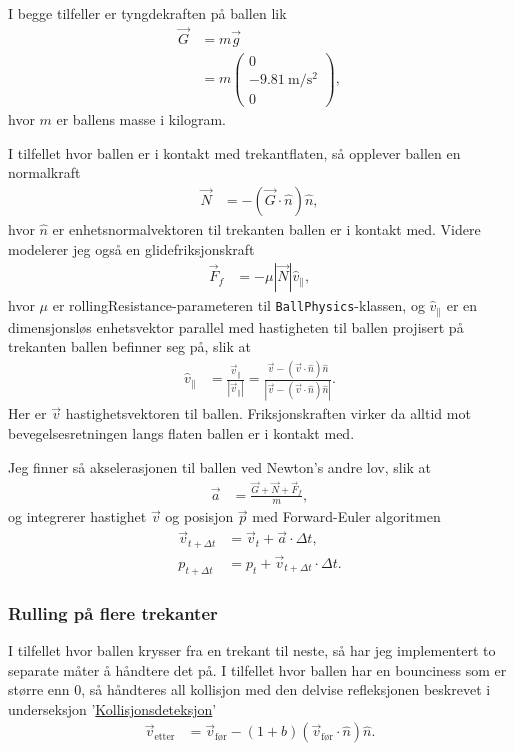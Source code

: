 \documentclass[norsk, doc, 12pt, a4paper]{apa7}  %
\begin{document}
I begge tilfeller er tyngdekraften på ballen lik
\begin{align*}
	\vec{G} &= m\vec{g} \\
	&= m
	\begin{pmatrix}
		0 \\
		\SI{-9.81}{\metre\per\second^{2}} \\
		0
	\end{pmatrix},
\end{align*}
hvor \(m\) er ballens masse i kilogram.

I tilfellet hvor ballen er i kontakt med trekantflaten, så opplever ballen en normalkraft
\begin{align*}
	\vec{N} &= -\left(\vec{G}\cdot\hat{n}\right)\hat{n},
\end{align*}
hvor \(\hat{n}\) er enhetsnormalvektoren til trekanten ballen er i kontakt med. Videre modelerer jeg også en glidefriksjonskraft
\begin{align*}
	\vec{F}_{f} &= -\mu |\vec{N}| \hat{v}_{\parallel},
\end{align*}
hvor \(\mu\) er rollingResistance-parameteren til \verb+BallPhysics+-klassen, og \(\hat{v}_{\parallel}\) er en dimensjonsløs enhetsvektor parallel med hastigheten til ballen projisert på trekanten ballen befinner seg på, slik at
\begin{align*}
	\hat{v}_{\parallel} &= \frac{\vec{v}_{\parallel}}{|\vec{v}_{\parallel}|}
	= \frac{\vec{v} - \left(\vec{v}\cdot\hat{n}\right)\hat{n}}{|\vec{v} - \left(\vec{v}\cdot\hat{n}\right)\hat{n}|}.
\end{align*}
Her er \(\vec{v}\) hastighetsvektoren til ballen. Friksjonskraften virker da alltid mot bevegelsesretningen langs flaten ballen er i kontakt med.

Jeg finner så akselerasjonen til ballen ved Newton's andre lov, slik at
\begin{align*}
	\vec{a} &= \frac{\vec{G}+\vec{N}+\vec{F}_{f}}{m},
\end{align*}
og integrerer hastighet \(\vec{v}\) og posisjon \(\vec{p}\) med Forward-Euler algoritmen
\begin{align*}
	\vec{v}_{t+\Delta t} &= \vec{v}_{t} + \vec{a}\cdot\Delta t, \\
	p_{t+\Delta t} &= p_{t} + \vec{v}_{t+\Delta t}\cdot \Delta t. 
\end{align*}

\subsubsection{Rulling på flere trekanter}
I tilfellet hvor ballen krysser fra en trekant til neste, så har jeg implementert to separate måter å håndtere det på. I tilfellet hvor ballen har en bounciness som er større enn \(0\), så håndteres all kollisjon med den delvise refleksjonen beskrevet i underseksjon '\hyperref[sec:3:A]{Kollisjonsdeteksjon}'
\begin{align*}
	\vec{v}_{\text{etter}} &= \vec{v}_{\text{før}} - \left(1+b\right)\left(\vec{v}_{\text{før}}\cdot\hat{n}\right)\hat{n}.
\end{align*}
\end{document}
